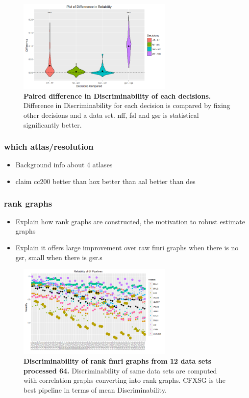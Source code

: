 \documentclass{article}
\begin{document}
\begin{figure}[t!]
\includegraphics[width=3.0in]{../Figs/Differ_violin_mean.png}
\caption{{ \bf Paired difference in Discriminability of each decisions.} Difference in Discriminability for each decision is compared by fixing other decisions and a data set. nff, fsl and gsr is statistical significantly better. }
\label{fig:7}
\end{figure}

\subsubsection{which atlas/resolution}
\begin{itemize}
	\item Background info about 4 atlases
	\item claim cc200 better than hox  better than aal better than des
\end{itemize}

\subsubsection{rank graphs}

\begin{itemize}
	\item Explain how rank graphs are constructed, the motivation to robust estimate graphs
	\item Explain it offers large improvement over raw fmri graphs when there is no gsr, small when there is gsr.s
\end{itemize}
\begin{figure}[t!]
	\includegraphics[width=3.0in]{../Figs/64_pipelines_size_rank.png}
	\caption{{\bf Discriminability of rank fmri graphs from 12 data sets processed 64.} Discriminability of same data sets are computed with correlation graphs converting into rank graphs. CFXSG is the best pipeline in terms of mean Discriminability.}
	\label{fig:8}
\end{figure}
\end{document}
